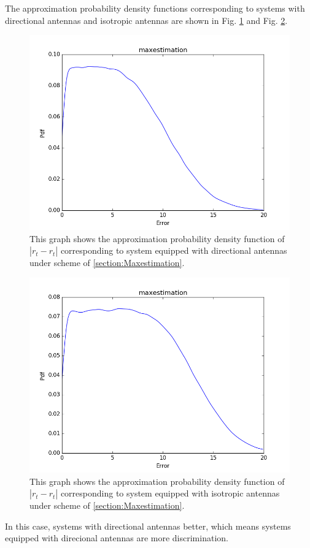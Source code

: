 	The approximation probability density functions corresponding to systems with directional antennas and isotropic antennas are shown in Fig. \ref{figure: maxdirex} and Fig. \ref{figure: maxomniex}.
	\begin{figure}[]
		\centering
		\includegraphics[scale=0.5]{Figures/maxdirex.png}
		\caption{This graph shows the approximation probability density function of $|r_{t}-\hat{r_{t}}|$ corresponding to system equipped with directional antennas under scheme of \ref{section:Maxestimation}. }
		\label{figure: maxdirex}
	\end{figure}
	\begin{figure}[]
		\centering
		\includegraphics[scale=0.5]{Figures/maxomniex.png}
		\caption{This graph shows the approximation probability density function of $|r_{t}-\hat{r_{t}}|$ corresponding to system equipped with isotropic antennas under scheme of \ref{section:Maxestimation}. }
		\label{figure: maxomniex}
	\end{figure}
In this case, systems with directional antennas better, which means systems equipped with direcional antennas are more discrimination.